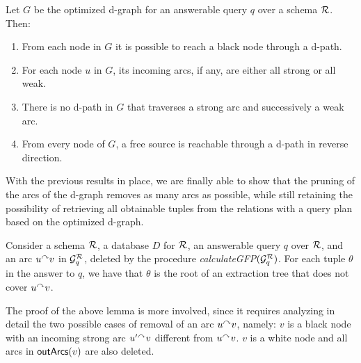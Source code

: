 \begin{proposition}\label{pro:dependency-graph}
  Let $G$ be the optimized d-graph for an answerable query $q$ over a schema $\mathcal{R}$. Then: %
  \begin{enumerate}
  \item From each node in $G$ it is possible to reach a black node through a d-path.
  \item For each node $u$ in $G$, its incoming arcs, if any, are either all strong or all weak.
  \item There is no d-path in $G$ that traverses a strong arc and successively a weak arc.
  \item From every node of $G$, a free source is reachable through a d-path in reverse direction.
  \end{enumerate}
\end{proposition}

With the previous results in place, we are finally able to show
that the pruning of the arcs of the
d-graph removes as many arcs as possible, while still retaining the
possibility of retrieving all obtainable tuples from the relations
with a query
plan based on the optimized d-graph.

\begin{lemma} \label{the:optim-soundness}
  Consider a schema $\mathcal{R}$, a database $D$ for $\mathcal{R}$, an answerable query $q$ over $\mathcal{R}$, 
and an arc $u\mbox{$^{\curvearrowright}$} v$ in
  $\mathcal{G}_q^{\mathcal{R}}$, deleted by the procedure \textit{calculateGFP}$(\mathcal{G}_q^{\mathcal{R}})$.
  For each tuple $\theta$ in the answer to $q$, we have that $\theta$ is the root of an extraction tree that does not cover $u\mbox{$^{\curvearrowright}$} v$.
\end{lemma}
The proof of the above lemma is more involved, since it requires analyzing in detail the two possible cases of removal of an arc $u\mbox{$^{\curvearrowright}$} v$, namely:
\myi $v$ is a black node with an incoming strong arc $u'\mbox{$^{\curvearrowright}$} v$ different from $u\mbox{$^{\curvearrowright}$} v$.
\myii $v$ is a white node and all arcs in $\textsf{outArcs}(v)$ are also deleted.

